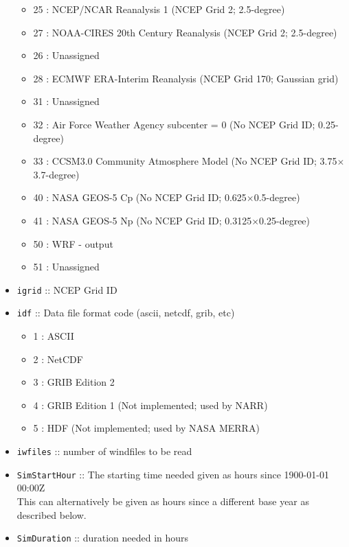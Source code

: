 \documentclass[11pt]{article}   %
\begin{document}
\begin{itemize}
\begin{itemize}
 \item  25 : NCEP/NCAR Reanalysis 1 (NCEP Grid 2; 2.5-degree)
 \item  27 : NOAA-CIRES 20th Century Reanalysis (NCEP Grid 2; 2.5-degree)
 \item  26 : Unassigned
 \item  28 : ECMWF ERA-Interim Reanalysis (NCEP Grid 170; Gaussian grid)
 \item  31 : Unassigned
 \item  32 : Air Force Weather Agency subcenter = 0 (No NCEP Grid ID; 0.25-degree)
 \item  33 : CCSM3.0 Community Atmosphere Model (No NCEP Grid ID; 3.75$\times$3.7-degree)
 \item  40 : NASA GEOS-5 Cp (No NCEP Grid ID; 0.625$\times$0.5-degree)
 \item  41 : NASA GEOS-5 Np (No NCEP Grid ID; 0.3125$\times$0.25-degree)
 \item  50 : WRF - output
 \item  51 : Unassigned
 \end{itemize}
\item \texttt{igrid} :: NCEP Grid ID
\item \texttt{idf} :: Data file format code (ascii, netcdf, grib, etc)
 \begin{itemize}
 \item   1 : ASCII
 \item   2 : NetCDF
 \item   3 : GRIB Edition 2
 \item   4 : GRIB Edition 1 (Not implemented; used by NARR)
 \item   5 : HDF (Not implemented; used by NASA MERRA)
 \end{itemize}
\item \texttt{iwfiles} :: number of windfiles to be read
\item \texttt{SimStartHour} ::  The starting time needed given as hours since 1900-01-01 00:00Z\\
This can alternatively be given as hours since a different base year as described below.
\item \texttt{SimDuration} ::  duration needed in hours
\end{itemize}
\end{document}
